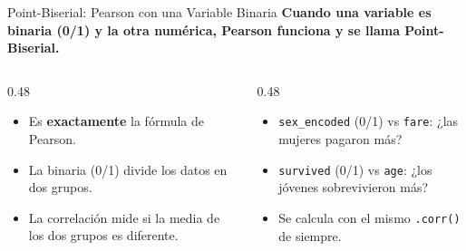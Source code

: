 \documentclass[aspectratio=169, 11pt]{beamer}
\begin{document}
\begin{frame}[shrink=5]{Point-Biserial: Pearson con una Variable Binaria}
  \vspace{-4pt}
  {\footnotesize\color{arcaDark}\bfseries
    Cuando una variable es binaria (0/1) y la otra numérica,
    Pearson funciona y se llama \textbf{Point-Biserial}.}

  \vspace{6pt}
  \begin{columns}[T]
    \begin{column}{0.48\textwidth}
      {\scriptsize
      \begin{itemize}\setlength{\itemsep}{5pt}
        \item[{\color{arcaRed}\faArrowRight}]
          Es \textbf{exactamente} la fórmula de Pearson.
        \item[{\color{arcaRed}\faArrowRight}]
          La binaria (0/1) divide los datos en dos grupos.
        \item[{\color{arcaRed}\faArrowRight}]
          La correlación mide si la media de los dos grupos es diferente.
      \end{itemize}
      }
    \end{column}

    \begin{column}{0.48\textwidth}
      {\scriptsize
      \begin{itemize}\setlength{\itemsep}{5pt}
        \item[{\color{codeGreen}\faCheckCircle}]
          \texttt{sex\_encoded} (0/1) vs \texttt{fare}: ¿las mujeres pagaron más?
        \item[{\color{codeGreen}\faCheckCircle}]
          \texttt{survived} (0/1) vs \texttt{age}: ¿los jóvenes sobrevivieron más?
        \item[{\color{codeGreen}\faCheckCircle}]
          Se calcula con el mismo \texttt{.corr()} de siempre.
      \end{itemize}
      }
    \end{column}
  \end{columns}
\end{frame}
\end{document}
